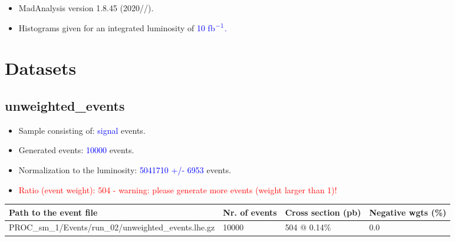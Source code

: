 \documentclass[a4paper, 10pt]{article}
\begin{document}
\begin{itemize}
  \item MadAnalysis version 1.8.45 (2020//).
   \item Histograms given for an integrated luminosity of \textcolor{blue}{10}\textcolor{blue}{ fb}$^{\textcolor{blue}{-1}}$\textcolor{blue}{.}
\textcolor{blue}{}
\end{itemize}
\newpage
\section{ Datasets}

\subsection{ unweighted\_events}

\begin{itemize}
  \item Sample consisting of: \textcolor{blue}{signal}  events.
   \item Generated events: \textcolor{blue}{10000 }  events.
   \item Normalization to the luminosity: \textcolor{blue}{5041710}\textcolor{blue}{ +/\-- }\textcolor{blue}{6953 }  events.
   \item\textcolor{red}{Ratio (event weight): }\textcolor{red}{504 }\textcolor{red}{ - warning: please generate more events (weight larger than 1)!}
\textcolor{red}{}
\end{itemize}
\begin{table}[H]
  \begin{center}
    \begin{tabular}{|m{55.0mm}|m{25.0mm}|m{30.0mm}|m{30.0mm}|}
      \hline
      {\cellcolor{yellow}         Path to the event file}& {\cellcolor{yellow}         Nr. of events}& {\cellcolor{yellow}         Cross section (pb)}& {\cellcolor{yellow}         Negative wgts (\%)}\\
      \hline
      {\cellcolor{white}          PROC\_sm\_1/\-Events/\-run\_02/\-unweighted\_events.lhe.gz}& {\cellcolor{white}          10000}& {\cellcolor{white}          504 @ 0.14\%}& {\cellcolor{white}          0.0}\\
\hline
    \end{tabular}
  \end{center}
\end{table}
\end{document}
